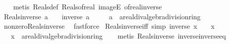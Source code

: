 \begin{isabellebody}
\ \ %
\endisadelimproof
%
\isatagproof
{}\isamarkupfalse%
\ {\isacharparenleft}{\kern0pt}metis\ Reals{\isacharunderscore}{\kern0pt}def\ Reals{\isacharunderscore}{\kern0pt}of{\isacharunderscore}{\kern0pt}real\ imageE\ of{\isacharunderscore}{\kern0pt}real{\isacharunderscore}{\kern0pt}inverse{\isacharparenright}{\kern0pt}%
\endisatagproof
{\isafoldproof}%
%
\isadelimproof
\isanewline
%
\endisadelimproof
\isanewline
{}\isamarkupfalse%
\ Reals{\isacharunderscore}{\kern0pt}inverse{\isacharcolon}{\kern0pt}\ {\isachardoublequoteopen}a\ {\isasymin}\ {\isasymreal}\ {\isasymLongrightarrow}\ inverse\ a\ {\isasymin}\ {\isasymreal}{\isachardoublequoteclose}\isanewline
\ \ \ a\ {\isacharcolon}{\kern0pt}{\isacharcolon}{\kern0pt}\ {\isachardoublequoteopen}{\isacharprime}{\kern0pt}a{\isacharcolon}{\kern0pt}{\isacharcolon}{\kern0pt}{\isacharbraceleft}{\kern0pt}real{\isacharunderscore}{\kern0pt}div{\isacharunderscore}{\kern0pt}algebra{\isacharcomma}{\kern0pt}division{\isacharunderscore}{\kern0pt}ring{\isacharbraceright}{\kern0pt}{\isachardoublequoteclose}\isanewline
%
\isadelimproof
\ \ %
\endisadelimproof
%
\isatagproof
{}\isamarkupfalse%
\ nonzero{\isacharunderscore}{\kern0pt}Reals{\isacharunderscore}{\kern0pt}inverse\ \isamarkupfalse%
\ fastforce%
\endisatagproof
{\isafoldproof}%
%
\isadelimproof
\isanewline
%
\endisadelimproof
\isanewline
{}\isamarkupfalse%
\ Reals{\isacharunderscore}{\kern0pt}inverse{\isacharunderscore}{\kern0pt}iff\ {\isacharbrackleft}{\kern0pt}simp{\isacharbrackright}{\kern0pt}{\isacharcolon}{\kern0pt}\ {\isachardoublequoteopen}inverse\ x\ {\isasymin}\ {\isasymreal}\ {\isasymlongleftrightarrow}\ x\ {\isasymin}\ {\isasymreal}{\isachardoublequoteclose}\isanewline
\ \ \ x\ {\isacharcolon}{\kern0pt}{\isacharcolon}{\kern0pt}\ {\isachardoublequoteopen}{\isacharprime}{\kern0pt}a{\isacharcolon}{\kern0pt}{\isacharcolon}{\kern0pt}{\isacharbraceleft}{\kern0pt}real{\isacharunderscore}{\kern0pt}div{\isacharunderscore}{\kern0pt}algebra{\isacharcomma}{\kern0pt}division{\isacharunderscore}{\kern0pt}ring{\isacharbraceright}{\kern0pt}{\isachardoublequoteclose}\isanewline
%
\isadelimproof
\ \ %
\endisadelimproof
%
\isatagproof
{}\isamarkupfalse%
\ {\isacharparenleft}{\kern0pt}metis\ Reals{\isacharunderscore}{\kern0pt}inverse\ inverse{\isacharunderscore}{\kern0pt}inverse{\isacharunderscore}{\kern0pt}eq{\isacharparenright}{\kern0pt}%
\endisatagproof
{\isafoldproof}%
%
\isadelimproof
\isanewline
%
\endisadelimproof
\isanewline
{}\isamarkupfalse%

\end{isabellebody}
